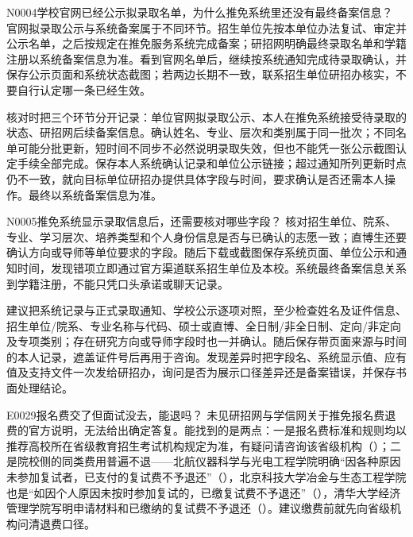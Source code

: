 \begin{qa}{N0004}{学校官网已经公示拟录取名单，为什么推免系统里还没有最终备案信息？}
官网拟录取公示与系统备案属于不同环节。招生单位先按本单位办法复试、审定并公示名单，之后按规定在推免服务系统完成备案；研招网明确最终录取名单和学籍注册以系统备案信息为准。看到官网名单后，继续按系统通知完成待录取确认，并保存公示页面和系统状态截图；若两边长期不一致，联系招生单位研招办核实，不要自行认定哪一条已经生效。

核对时把三个环节分开记录：单位官网拟录取公示、本人在推免系统接受待录取的状态、研招网后续备案信息。确认姓名、专业、层次和类别属于同一批次；不同名单可能分批更新，短时间不同步不必然说明录取失效，但也不能凭一张公示截图认定手续全部完成。保存本人系统确认记录和单位公示链接；超过通知所列更新时点仍不一致，就向目标单位研招办提供具体字段与时间，要求确认是否还需本人操作。最终以系统备案信息为准。
\end{qa}

\begin{qa}{N0005}{推免系统显示录取信息后，还需要核对哪些字段？}
核对招生单位、院系、专业、学习层次、培养类型和个人身份信息是否与已确认的志愿一致；直博生还要确认方向或导师等单位要求的字段。随后下载或截图保存系统页面、单位公示和通知时间，发现错项立即通过官方渠道联系招生单位及本校。系统最终备案信息关系到学籍注册，不能只凭口头承诺或聊天记录。

建议把系统记录与正式录取通知、学校公示逐项对照，至少检查姓名及证件信息、招生单位/院系、专业名称与代码、硕士或直博、全日制/非全日制、定向/非定向及专项类别；存在研究方向或导师字段时也一并确认。随后保存带页面来源与时间的本人记录，遮盖证件号后再用于咨询。发现差异时把字段名、系统显示值、应有值及支持文件一次发给研招办，询问是否为展示口径差异还是备案错误，并保存书面处理结论。
\end{qa}
\begin{qa}{E0029}{报名费交了但面试没去，能退吗？}
未见研招网与学信网关于推免报名费退费的官方说明，无法给出确定答复。能找到的是两点：一是报名费标准和规则均以推荐高校所在省级教育招生考试机构规定为准，有疑问请咨询该省级机构（）；二是院校侧的同类费用普遍不退——北航仪器科学与光电工程学院明确“因各种原因未参加复试者，已支付的复试费不予退还”（），北京科技大学冶金与生态工程学院也是“如因个人原因未按时参加复试的，已缴复试费不予退还”（），清华大学经济管理学院写明申请材料和已缴纳的复试费不予退还（）。建议缴费前就先向省级机构问清退费口径。
\end{qa}


